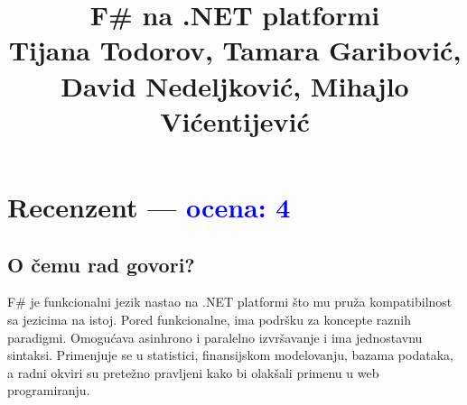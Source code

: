 \documentclass[a4paper]{report}
\newcommand{\odgovor}[1]{\textcolor{blue}{#1}}
\begin{document}
\title{F\# na .NET platformi\\ \small{Tijana Todorov, Tamara Garibović,\\ David Nedeljković, Mihajlo Vićentijević}}

\maketitle

\tableofcontents

\chapter{Recenzent \odgovor{--- ocena: 4} }


\section{O čemu rad govori?}
F\# je funkcionalni jezik nastao na .NET platformi što mu pruža kompatibilnost sa jezicima na istoj. Pored funkcionalne, ima podršku za koncepte raznih paradigmi. Omogućava asinhrono i paralelno izvršavanje i ima jednostavnu sintaksi. Primenjuje se u statistici, finansijskom modelovanju, bazama podataka, a radni okviri su pretežno pravljeni kako bi olakšali primenu u web programiranju.
\end{document}
